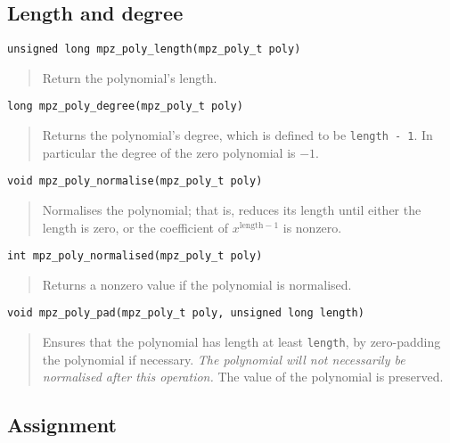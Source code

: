 \documentclass[a4paper,10pt]{article}
\newcommand{\code}{\lstinline}
\begin{document}
\subsection{Length and degree}

\begin{lstlisting}
unsigned long mpz_poly_length(mpz_poly_t poly)
\end{lstlisting}
\begin{quote}
Return the polynomial's length.
\end{quote}

\begin{lstlisting}
long mpz_poly_degree(mpz_poly_t poly)
\end{lstlisting}
\begin{quote}
Returns the polynomial's degree, which is defined to be \code{length - 1}. In particular the degree of the zero polynomial is $-1$.
\end{quote}

\begin{lstlisting}
void mpz_poly_normalise(mpz_poly_t poly)
\end{lstlisting}
\begin{quote}
Normalises the polynomial; that is, reduces its length until either the length is zero, or the coefficient of $x^{\text{length} - 1}$ is nonzero.
\end{quote}

\begin{lstlisting}
int mpz_poly_normalised(mpz_poly_t poly)
\end{lstlisting}
\begin{quote}
Returns a nonzero value if the polynomial is normalised.
\end{quote}


\begin{lstlisting}
void mpz_poly_pad(mpz_poly_t poly, unsigned long length)
\end{lstlisting}
\begin{quote}
Ensures that the polynomial has length at least \code{length}, by zero-padding the polynomial if necessary. \emph{The polynomial will not necessarily be normalised after this operation.} The value of the polynomial is preserved.
\end{quote}



\subsection{Assignment}
\end{document}
